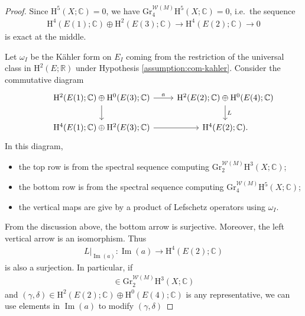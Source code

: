 \begin{proof}
Since \(\mathrm{H}^{5}(X;\mathbb{C})=0\), we have
\(\mathrm{Gr}_{4}^{\mathcal{W}(M)}\mathrm{H}^{5}(X;\mathbb{C})=0\), i.e.~the sequence
\begin{eqnarray*}
\mathrm{H}^{4}(E(1);\mathbb{C})\oplus\mathrm{H}^{2}(E(3);\mathbb{C})
\to \mathrm{H}^{4}(E(2);\mathbb{C})\to 0
\end{eqnarray*}
is exact at the middle. 

Let \(\omega_{I}\) be the K\"{a}hler form on \(E_{I}\) coming from the
restriction of the universal class
in \(\mathrm{H}^{2}(E;\mathbb{R})\) under Hypothesis \ref{assumption:com-kahler}.
Consider the commutative diagram
\begin{equation}
\begin{tikzcd}
&\mathrm{H}^{2}(E(1);\mathbb{C})\oplus\mathrm{H}^{0}(E(3);\mathbb{C})
\ar[r,"a"]\ar[d] &\mathrm{H}^{2}(E(2);\mathbb{C})\oplus\mathrm{H}^{0}(E(4);\mathbb{C})\ar[d,"L"]\\
&\mathrm{H}^{4}(E(1);\mathbb{C})\oplus\mathrm{H}^{2}(E(3);\mathbb{C})
\ar[r] &\mathrm{H}^{4}(E(2);\mathbb{C}).
\end{tikzcd}
\end{equation}
In this diagram, 
\begin{itemize}
\item the top row is from the 
spectral sequence computing \(\mathrm{Gr}_{2}^{\mathcal{W}(M)}\mathrm{H}^{3}(X;\mathbb{C})\);
\item the bottom row is from the 
spectral sequence computing \(\mathrm{Gr}_{4}^{\mathcal{W}(M)}\mathrm{H}^{5}(X;\mathbb{C})\);
\item the vertical maps are give by a product of Lefschetz operators using \(\omega_{I}\).
\end{itemize}
From the discussion above, the bottom arrow is surjective. 
Moreover, the left vertical arrow is an isomorphism.
Thus 
\begin{eqnarray*}
\left.L\right|_{\operatorname{Im}(a)}
\colon \operatorname{Im}(a)\to \mathrm{H}^{4}(E(2);\mathbb{C})
\end{eqnarray*}
is also a surjection. In particular, if 
\begin{eqnarray*}
[\gamma,\delta]\in \mathrm{Gr}_{2}^{\mathcal{W}(M)}\mathrm{H}^{3}(X;\mathbb{C})
\end{eqnarray*}
and \((\gamma,\delta)\in 
\mathrm{H}^{2}(E(2);\mathbb{C})\oplus\mathrm{H}^{0}(E(4);\mathbb{C})\) is any representative,
we can use elements in \(\operatorname{Im}(a)\) to modify \((\gamma,\delta)\)

\end{proof}

